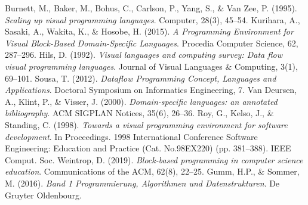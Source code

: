 \documentclass{article}
\begin{document}
\begin{thebibliography}{9}
        Burnett, M., Baker, M., Bohus, C., Carlson, P., Yang, S., \& Van Zee, P. (1995). \emph{Scaling up visual programming languages}. Computer, 28(3), 45–54.
        Kurihara, A., Sasaki, A., Wakita, K., \& Hosobe, H. (2015). \emph{A Programming Environment for Visual Block-Based Domain-Specific Languages}. Procedia Computer Science, 62, 287–296.
        Hils, D. (1992). \emph{Visual languages and computing survey: Data flow visual programming languages}. Journal of Visual Languages \& Computing, 3(1), 69–101.
        Sousa, T. (2012). \emph{Dataﬂow Programming Concept, Languages and Applications}. Doctoral Symposium on Informatics Engineering, 7.
        Van Deursen, A., Klint, P., \& Visser, J. (2000). \emph{Domain-specific languages: an annotated bibliography}. ACM SIGPLAN Notices, 35(6), 26–36.
        Roy, G., Kelso, J., \& Standing, C. (1998). \emph{Towards a visual programming environment for software development}. In Proceedings. 1998 International Conference Software Engineering: Education and Practice (Cat. No.98EX220) (pp. 381–388). IEEE Comput. Soc.
        Weintrop, D. (2019). \emph{Block-based programming in computer science education}. Communications of the ACM, 62(8), 22–25.
        Gumm, H.P., \& Sommer, M. (2016). \emph{Band 1 Programmierung, Algorithmen und Datenstrukturen}. De Gruyter Oldenbourg.
    \end{thebibliography}
\end{document}
